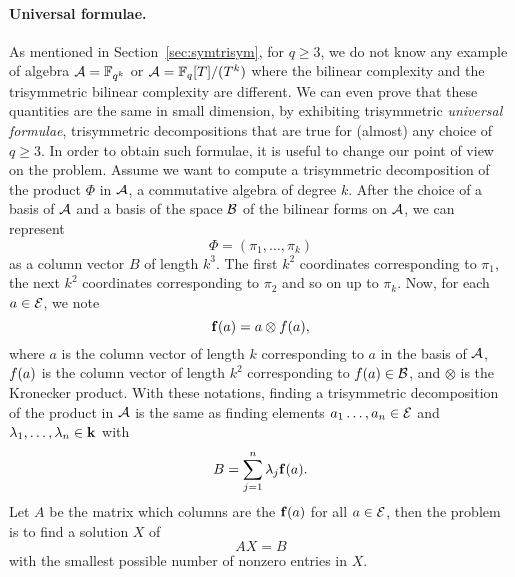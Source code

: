 \documentclass[11pt]{article}
\begin{document}
\paragraph{Universal formulae.}
As mentioned in Section~\ref{sec:symtrisym}, for $q\geq3$, we do not know any example of
algebra $\mathcal{A}=\mathbb{F}_{q^k}$ or $\mathcal{A}=\mathbb{F}_{q}[T]/(T^k)$ where the bilinear complexity and
the trisymmetric bilinear complexity are different. We can even prove that these
quantities are the same in small dimension, by exhibiting trisymmetric \emph{universal
formulae}, \ie trisymmetric decompositions that are true for (almost) any choice
of $q\geq3$. In order to obtain such formulae, it is useful to
change our point of view on the problem. Assume we want to compute a
trisymmetric decomposition of the product $\Phi$ in $\mathcal{A}$, a commutative algebra
of degree $k$. After the choice of a basis of $\mathcal{A}$ and a basis of the space $\mathcal{B}$
of the bilinear forms on $\mathcal{A}$, we can represent
\[
  \Phi=(\pi_1, \dots, \pi_k)
\]
as a column vector $B$ of length $k^3$. The first $k^2$ coordinates corresponding
to $\pi_1$, the next $k^2$ coordinates corresponding to $\pi_2$ and so on up to
$\pi_k$. Now, for each $a\in\mathcal{E}$, we note
\[
  \mathbf{f}(a) = a\otimes f(a),
\] 
where $a$ is the column vector of length $k$ corresponding to $a$ in the basis
of $\mathcal{A}$, $f(a)$ is the column vector of length $k^2$ corresponding
to $f(a)\in\mathcal{B}$, and $\otimes$ is the Kronecker product. With these notations,
finding a trisymmetric decomposition of the product in
$\mathcal{A}$ is the same as finding elements $a_1\dots,
a_n\in\mathcal{E}$ and $\lambda_1, \dots, \lambda_n\in\mathbf{k}$ with
\[
  B = \sum_{j=1}^n \lambda_j\mathbf{f}(a).
\]
Let $A$ be the matrix which columns are the $\mathbf{f}(a)$ for all $a\in\mathcal{E}$, then the
problem is to find a solution $X$ of
\[
  AX = B
\]
with the smallest possible number of nonzero entries in $X$.
\end{document}
